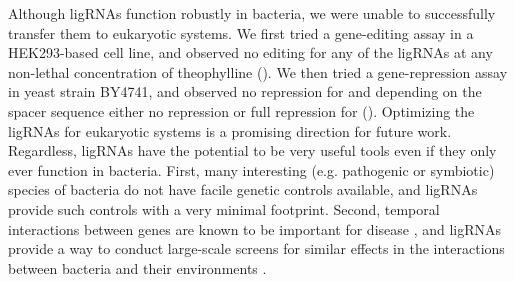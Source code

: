 \documentclass[10pt,oneside]{article}
\begin{document}
% 
% 
Although ligRNAs function robustly in bacteria, we were unable to successfully transfer them to eukaryotic systems.  We first tried a gene-editing assay in a HEK293-based cell line, and observed no editing for any of the ligRNAs at any non-lethal concentration of theophylline ().  We then tried a gene-repression assay in yeast strain BY4741, and observed no repression for \ligrnaF{} and depending on the spacer sequence either no repression or full repression for \ligrnaB{} ().  Optimizing the ligRNAs for eukaryotic systems is a promising direction for future work.  Regardless, ligRNAs have the potential to be very useful tools even if they only ever function in bacteria.  First, many interesting (e.g. pathogenic or symbiotic) species of bacteria do not have facile genetic controls available, and ligRNAs provide such controls with a very minimal footprint.  Second, temporal interactions between genes are known to be important for disease \autocite{lee2012}, and ligRNAs provide a way to conduct large-scale screens for similar effects in the interactions between bacteria and their environments \autocite{peters2016}.
% 
% 
% 
%

\end{document}
